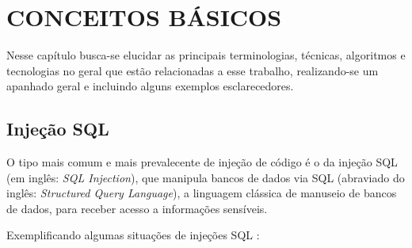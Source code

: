 \chapter{CONCEITOS BÁSICOS\textbf{}}
\label{chp:capitulo2}

Nesse capítulo busca-se elucidar as principais terminologias, técnicas, algoritmos e tecnologias no geral que estão relacionadas a esse trabalho, realizando-se um apanhado geral e incluindo alguns exemplos esclarecedores.

\section{Injeção SQL}

O tipo mais comum e mais prevalecente de injeção de código é o da injeção SQL (em inglês: \textit{SQL Injection}), que manipula bancos de dados via SQL (abraviado do inglês: \textit{Structured Query Language}), a linguagem clássica de manuseio de bancos de dados, para receber acesso a informações sensíveis.

Exemplificando algumas situações de injeções SQL \cite{sql_port_swigger}:

